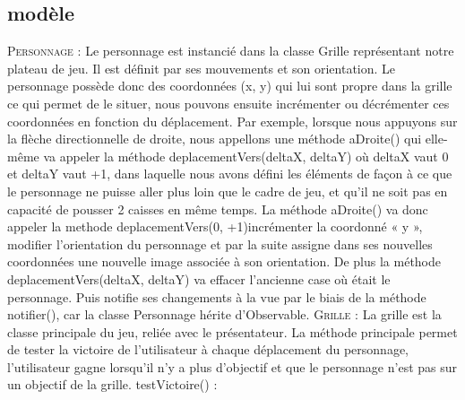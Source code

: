 \documentclass[a4paper,12pt]{article} %
\begin{document}
\subsection{modèle}
\noindent 
\newline\newline
\textsc{Personnage :}
\newline\newline
Le personnage est instancié dans la classe Grille représentant notre plateau de jeu. Il est définit par ses mouvements et son orientation.
\newline
Le personnage possède donc des coordonnées (x, y) qui lui sont propre dans la grille ce qui permet de le situer, nous pouvons ensuite incrémenter ou décrémenter ces coordonnées en fonction du déplacement.
\newline
Par exemple, lorsque nous appuyons sur la flèche directionnelle de droite, nous appellons une méthode aDroite() qui elle-même va appeler la méthode deplacementVers(deltaX, deltaY) où deltaX vaut 0 et deltaY vaut +1, dans laquelle nous avons défini les éléments de façon à ce que le personnage ne puisse aller plus loin que le cadre de jeu, et qu'il ne soit pas en capacité de pousser 2 caisses en même temps.
\newline
La méthode aDroite() va donc appeler la methode deplacementVers(0, +1)incrémenter la coordonné « y », modifier l’orientation du personnage et par la suite assigne dans ses nouvelles coordonnées une nouvelle image associée à son orientation.
\newline
De plus la méthode deplacementVers(deltaX, deltaY) va effacer l’ancienne case où était le personnage.
\newline
Puis notifie ses changements à la vue par le biais de la méthode notifier(), car la classe Personnage hérite d’Observable.
\newline\newline
\textsc{Grille :}
\newline\newline
La grille est la classe principale du jeu, reliée avec le présentateur.
La méthode principale permet de tester la victoire de l’utilisateur à chaque déplacement du personnage, l’utilisateur gagne lorsqu’il n'y a plus d’objectif et que le personnage n'est pas sur un objectif de la grille.
\newline\newline
testVictoire() : 
\newline\newline
\end{document}

